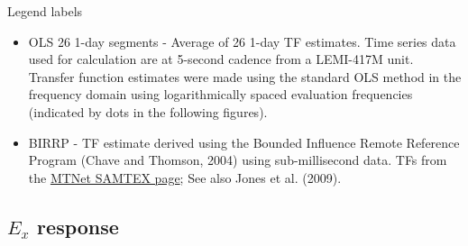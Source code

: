 \documentclass{article}
\begin{document}
\clearpage

Legend labels

\begin{itemize}

    \item OLS 26 1-day segments - Average of 26 1-day TF estimates. Time series data used for calculation are at 5-second cadence from a LEMI-417M unit. Transfer function estimates were made using the standard OLS method in the frequency domain using logarithmically spaced evaluation frequencies (indicated by dots in the following figures).


    \item BIRRP - TF estimate derived using the Bounded Influence Remote Reference Program (Chave and Thomson, 2004) using sub-millisecond data. TFs from the \href{https://www.mtnet.info/data/samtex/samtex.html}{MTNet SAMTEX page}; See also Jones et al. (2009).

\end{itemize}

\clearpage

\subsection{$E_x$ response}
\end{document}
